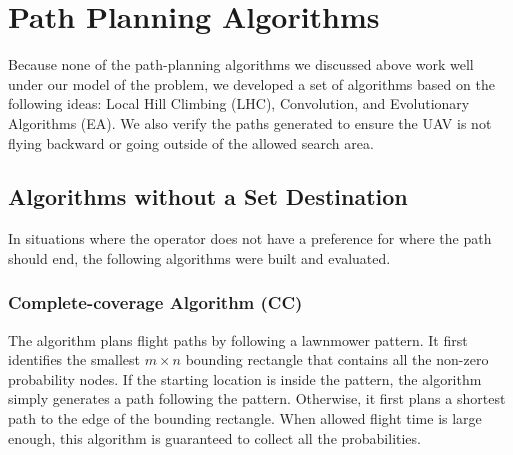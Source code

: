 \section{Path Planning Algorithms}

Because none of the path-planning algorithms we discussed above work well under our model of the problem, we developed a set of algorithms based on the following ideas: Local Hill Climbing (LHC), Convolution, and Evolutionary Algorithms (EA). We also verify the paths generated to ensure the UAV is not flying backward or going outside of the allowed search area.

\subsection{Algorithms without a Set Destination}

In situations where the operator does not have a preference for where the path should end, the following algorithms were built and evaluated.

\subsubsection{Complete-coverage Algorithm (CC)}

The algorithm plans flight paths by following a lawnmower pattern. It first identifies the smallest $m \!{\times} n$ bounding rectangle that contains all the non-zero probability nodes. If the starting location is inside the pattern, the algorithm simply generates a path following the pattern. Otherwise, it first plans a shortest path to the edge of the bounding rectangle. When allowed flight time is large enough, this algorithm is guaranteed to collect all the probabilities.

%

